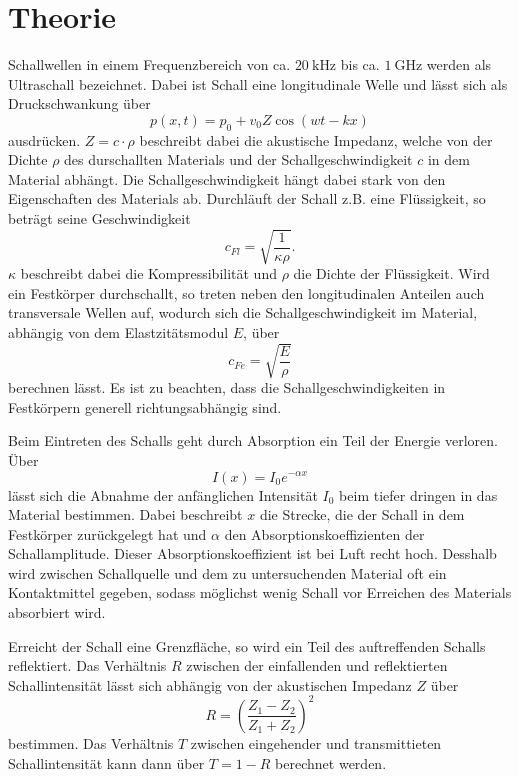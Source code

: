 \section{Theorie}
\label{sec:Theorie}
Schallwellen in einem Frequenzbereich von ca. $\SI{20}{\kilo\hertz}$ bis ca. $\SI{1}{\giga\hertz}$ werden als Ultraschall bezeichnet. Dabei ist Schall eine longitudinale Welle und lässt sich als Druckschwankung über
\begin{equation}
 p(x,t)=p_0+v_0Z\cos(wt-kx)
\end{equation}
ausdrücken. $Z=c\cdot \rho$ beschreibt dabei die akustische Impedanz, welche von der Dichte $\rho$ des durschallten Materials und der Schallgeschwindigkeit $c$ in dem Material abhängt.
Die Schallgeschwindigkeit hängt dabei stark von den Eigenschaften des Materials ab. Durchläuft der Schall z.B. eine Flüssigkeit, so beträgt seine Geschwindigkeit
\begin{equation}
    c_{Fl}=\sqrt{\frac{1}{\kappa \rho}} .
\end{equation}
$\kappa$ beschreibt dabei die Kompressibilität und $\rho$ die Dichte der Flüssigkeit.
Wird ein Festkörper durchschallt, so treten neben den longitudinalen Anteilen auch transversale Wellen auf, wodurch sich die Schallgeschwindigkeit im Material, abhängig von dem Elastzitätsmodul $E$, über
\begin{equation}
    c_{Fe}=\sqrt{\frac{E}{\rho}}
\end{equation}
berechnen lässt.
Es ist zu beachten, dass die Schallgeschwindigkeiten in Festkörpern generell richtungsabhängig sind. 

Beim Eintreten des Schalls geht durch Absorption ein Teil der Energie verloren. Über 
\begin{equation}
    I(x)=I_0e^{-\alpha x}
    \label{eqn:abs}
\end{equation}
lässt sich die Abnahme der anfänglichen Intensität $I_0$ beim tiefer dringen in das Material bestimmen. Dabei beschreibt $x$ die Strecke, die der Schall in dem Festkörper zurückgelegt hat und $\alpha$ den Absorptionskoeffizienten der Schallamplitude. Dieser Absorptionskoeffizient ist bei Luft recht hoch. Desshalb wird zwischen Schallquelle und dem zu untersuchenden Material oft ein Kontaktmittel gegeben, sodass möglichst wenig Schall vor Erreichen des Materials absorbiert wird. 

Erreicht der Schall eine Grenzfläche, so wird ein Teil des auftreffenden Schalls reflektiert. Das Verhältnis $R$ zwischen der einfallenden und reflektierten Schallintensität lässt sich abhängig von der akustischen Impedanz $Z$ über
\begin{equation}
    R=\left(\frac{Z_1-Z_2}{Z_1+Z_2}\right)^2
\end{equation}
bestimmen. Das Verhältnis $T$ zwischen eingehender und transmittieten Schallintensität kann dann über $T=1-R$ berechnet werden.

